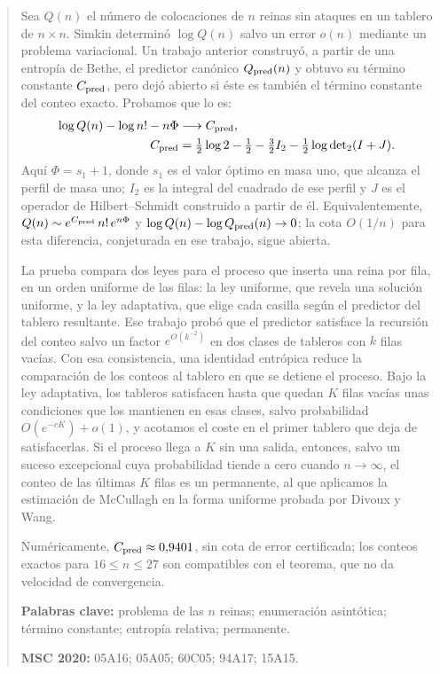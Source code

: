 \begin{abstract}
\noindent Sea $Q(n)$ el número de colocaciones de $n$ reinas sin ataques en un tablero de
$n\times n$. Simkin determinó $\log Q(n)$ salvo un error $o(n)$ mediante un problema variacional. Un
trabajo anterior construyó, a partir de una entropía de Bethe, el predictor canónico
$Q_{\rm pred}(n)$ y obtuvo su término constante $C_{\rm pred}$, pero dejó abierto si éste es también
el término constante del conteo exacto. Probamos que lo es:
\[
\begin{aligned}
 \log Q(n)-\log n!-n\Phi &\longrightarrow C_{\rm pred},\\
 C_{\rm pred} &=\tfrac12\log2-\tfrac12-\tfrac32I_2-\tfrac12\log{\det}_2(I+J).
\end{aligned}
\]
Aquí $\Phi=s_1+1$, donde $s_1$ es el valor óptimo en masa uno, que alcanza el perfil de masa uno;
$I_2$ es la integral del cuadrado de ese perfil y $J$ es el operador de Hilbert--Schmidt construido
a partir de él. Equivalentemente, $Q(n)\sim e^{C_{\rm pred}}\,n!\,e^{n\Phi}$ y
$\log Q(n)-\log Q_{\rm pred}(n)\to0$; la cota $O(1/n)$ para esta diferencia, conjeturada en ese
trabajo, sigue abierta.

\smallskip\noindent La prueba compara dos leyes para el proceso que inserta una reina por fila, en
un orden uniforme de las filas: la ley uniforme, que revela una solución uniforme, y la ley
adaptativa, que elige cada casilla según el predictor del tablero resultante. Ese trabajo probó que
el predictor satisface la recursión del conteo salvo un factor $e^{O(k^{-2})}$ en dos clases de
tableros con $k$ filas vacías. Con esa consistencia, una identidad entrópica reduce la comparación
de los conteos al tablero en que se detiene el proceso. Bajo la ley adaptativa, los tableros
satisfacen hasta que quedan $K$ filas vacías unas condiciones que los mantienen en esas clases,
salvo probabilidad $O(e^{-cK})+o(1)$, y acotamos el coste en el primer tablero que deja de
satisfacerlas. Si el proceso llega a $K$ sin una salida, entonces, salvo un suceso excepcional cuya
probabilidad tiende a cero cuando $n\to\infty$, el conteo de las últimas $K$ filas es un permanente,
al que aplicamos la estimación de McCullagh en la forma uniforme probada por Divoux y Wang.

\smallskip\noindent Numéricamente, $C_{\rm pred}\approx0{,}9401$, sin cota de error certificada; los
conteos exactos para ${16\le n\le27}$ son compatibles con el teorema, que no da velocidad de
convergencia.

\medskip\noindent
\textbf{Palabras clave:} problema de las $n$ reinas; enumeración asintótica; término constante;
entropía relativa; permanente.

\noindent
\textbf{MSC 2020:} 05A16; 05A05; 60C05; 94A17; 15A15.
\end{abstract}
